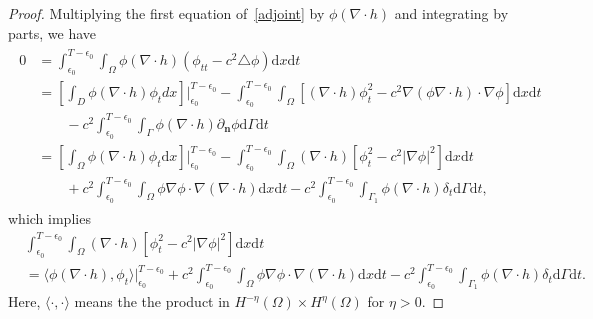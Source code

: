 \documentclass[10pt]{elsarticle}
\begin{document}
\begin{proof}
Multiplying the first equation of~\eqref{adjoint} by $\phi(\nabla\cdot h)$ and integrating by parts, we have
\begin{eqnarray*}
\begin{aligned}
	0&=\int_{\epsilon_0}^{T-\epsilon_0}\int_{\Omega}\phi(\nabla\cdot h) (\phi_{tt}-c^2\triangle \phi)\mathrm{d}x\mathrm{d}t \\
	&=\left[\int_{D}\phi(\nabla\cdot h) \phi_{t}dx\right]\bigg|_{\epsilon_0}^{T-\epsilon_0}-\int_{\epsilon_0}^{T-\epsilon_0}\int_{\Omega}\left[(\nabla\cdot h)\phi_t^2-c^2 \nabla( \phi \nabla\cdot h)\cdot \nabla\phi\right]\mathrm{d}x\mathrm{d}t\\
	&\qquad-c^2\int_{\epsilon_0}^{T-\epsilon_0}\int_{\Gamma} \phi(\nabla\cdot h){\partial_{ \mathbf{n}}\phi} \mathrm{d}\Gamma \mathrm{d}t\\
	&= \left[\int_{\Omega}\phi(\nabla\cdot h) \phi_{t}\mathrm{d}x \right]\bigg|_{\epsilon_0}^{T-\epsilon_0}-\int_{\epsilon_0}^{T-\epsilon_0}\int_{\Omega}(\nabla\cdot h)\left[\phi_t^2-c^2 |\nabla\phi|^2\right] \mathrm{d}x\mathrm{d}t\\
	&\qquad+c^2 \int_{\epsilon_0}^{T-\epsilon_0}\int_{\Omega}  \phi \nabla\phi \cdot \nabla(\nabla\cdot h)\mathrm{d}x\mathrm{d}t - c^2\int_{\epsilon_0}^{T-\epsilon_0}\int_{\Gamma_1} \phi(\nabla\cdot h)\delta_t \mathrm{d}\Gamma \mathrm{d}t,
\end{aligned}
\end{eqnarray*}
which implies
\begin{equation}
\begin{aligned} \label{ob4}
	&\int_{\epsilon_0}^{T-\epsilon_0}\int_{\Omega}(\nabla\cdot h)[\phi_t^2-c^2 |\nabla\phi|^2]\mathrm{d}x\mathrm{d}t\\
	&=\langle\phi(\nabla\cdot h), \phi_{t}\rangle\bigg|_{\epsilon_0}^{T-\epsilon_0}+c^2 \int_{\epsilon_0}^{T-\epsilon_0}\int_{\Omega}  \phi \nabla\phi \cdot \nabla(\nabla\cdot h)\mathrm{d}x\mathrm{d}t - c^2\int_{\epsilon_0}^{T-\epsilon_0}\int_{\Gamma_1} \phi(\nabla\cdot h)\delta_t \mathrm{d}\Gamma \mathrm{d}t.	
\end{aligned}
\end{equation}
Here, $\langle\cdot, \cdot\rangle$ means the the product in $H^{-\eta}(\Omega)\times H^{\eta}(\Omega)$ for $\eta>0$. 


\end{proof}
\end{document}
